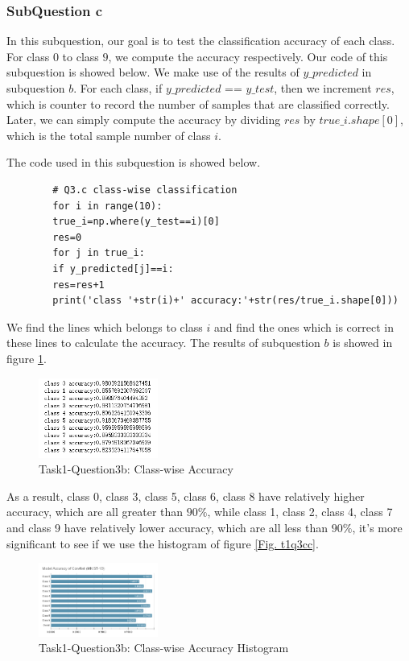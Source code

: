 \documentclass[conference]{IEEEtran}
\begin{document}
	\subsubsection{SubQuestion c}
	In this subquestion, our goal is to test the classification accuracy of each class. For class $0$ to class $9$, we compute the accuracy respectively. Our code of this subquestion is showed below. We make use of the results of $y\_predicted$ in subquestion $b$. For each class, if $y\_predicted$ == $y\_test$, then we increment $res$, which is counter to record the number of samples that are classified correctly. Later, we can simply compute the accuracy by dividing $res$ by $true\_i.shape[0]$, which is the total sample number of class $i$.\par
	The code used in this subquestion is showed below.
	\begin{lstlisting}
		# Q3.c class-wise classification
		for i in range(10):
		true_i=np.where(y_test==i)[0]
		res=0
		for j in true_i:
		if y_predicted[j]==i:
		res=res+1
		print('class '+str(i)+' accuracy:'+str(res/true_i.shape[0]))
	\end{lstlisting} \par 
	We find the lines which belongs to class $i$ and find the ones which is correct in these lines to calculate the accuracy. The results of subquestion $b$ is showed in figure \ref{Fig.t1q3c}.\par
	\begin{figure}[h] 
		\centering
		\includegraphics[width=0.35\textwidth]{./graphs/T1Q3c.png}
		\caption{Task1-Question3b: Class-wise Accuracy} 
		\label{Fig.t1q3c} 
	\end{figure}
	
	
	As a result, class 0, class 3, class 5, class 6, class 8 have relatively higher accuracy, which are all greater than $90\%$, while class 1, class 2, class 4, class 7 and class 9 have relatively lower accuracy, which are all less than $90\%$, it's more significant to see if we use the histogram of figure \ref{Fig. t1q3cc}.

	\begin{figure}[h] 
		\centering
		\includegraphics[width=0.35\textwidth]{./pics/MNIST-1D/acc.png}
		\caption{Task1-Question3b: Class-wise Accuracy Histogram} 
		\label{Fig.t1q3cc} 
	\end{figure}
	
\end{document}
